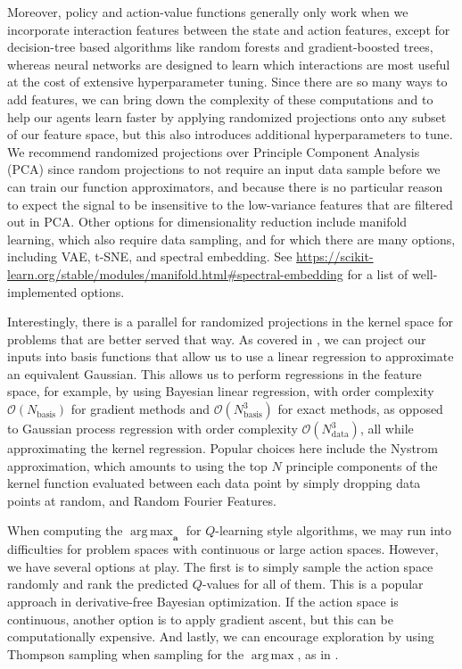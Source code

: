 \documentclass{article}
\DeclareMathOperator*{\argmax}{arg\,max}
\begin{document}
Moreover, policy and action-value functions generally only work when we incorporate interaction features between the state and action features, except for decision-tree based algorithms like random forests and gradient-boosted trees, whereas neural networks are designed to learn which interactions are most useful at the cost of extensive hyperparameter tuning. Since there are so many ways to add features, we can bring down the complexity of these computations and to help our agents learn faster by applying randomized projections onto any subset of our feature space, but this also introduces additional hyperparameters to tune. We recommend randomized projections over Principle Component Analysis (PCA) since random projections to not require an input data sample before we can train our function approximators, and because there is no particular reason to expect the signal to be insensitive to the low-variance features that are filtered out in PCA. Other options for dimensionality reduction include manifold learning, which also require data sampling, and for which there are many options, including VAE, t-SNE, and spectral embedding. See \url{https://scikit-learn.org/stable/modules/manifold.html#spectral-embedding} for a list of well-implemented options.

Interestingly, there is a parallel for randomized projections in the kernel space for problems that are better served that way. As covered in \cite{GP_BLR}, we can project our inputs into basis functions that allow us to use a linear regression to approximate an equivalent Gaussian. This allows us to perform regressions in the feature space, for example, by using Bayesian linear regression, with order complexity $\mathcal{O}(N_\text{basis})$ for gradient methods and  $\mathcal{O}(N_\text{basis}^3)$ for exact methods, as opposed to Gaussian process regression with order complexity $\mathcal{O}(N_\text{data}^3)$, all while approximating the kernel regression. Popular choices here include the Nystrom approximation, which amounts to using the top $N$ principle components of the kernel function evaluated between each data point by simply dropping data points at random, and Random Fourier Features.

When computing the $\argmax_\mathbf{a}$ for $Q$-learning style algorithms, we may run into difficulties for problem spaces with continuous or large action spaces. However, we have several options at play. The first is to simply sample the action space randomly and rank the predicted $Q$-values for all of them. This is a popular approach in derivative-free Bayesian optimization. If the action space is continuous, another option is to apply gradient ascent, but this can be computationally expensive. And lastly, we can encourage exploration by using Thompson sampling when sampling for the $\argmax$, as in \cite{RLSVI}.
\end{document}
